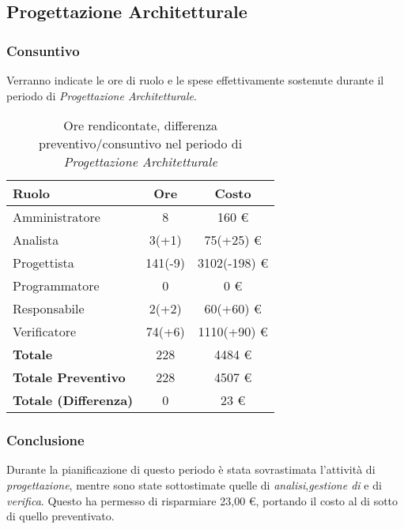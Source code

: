 \subsection{Progettazione Architetturale}
\subsubsection{Consuntivo}
Verranno indicate le ore di ruolo e le spese effettivamente sostenute durante il periodo di \textit{Progettazione Architetturale}.

\begin{table}[H]
	\centering
	\begin{tabular}{ l c c }
		\textbf{Ruolo} & \textbf{Ore} & \textbf{Costo} \\
		\hline
		Amministratore & 8 & 160 \euro{} \\
		Analista & 3(+1) & 75(+25) \euro{} \\
		Progettista & 141(-9) & 3102(-198) \euro{} \\
		Programmatore & 0 & 0 \euro{} \\
		Responsabile & 2(+2) & 60(+60) \euro{} \\
		Verificatore & 74(+6) & 1110(+90) \euro{} \\
		\hline
		\textbf{Totale \glossaryItem{Consuntivo}} & 228 & 4484 \euro{} \\
		\hline
		\textbf{Totale Preventivo} & 228 & 4507 \euro{} \\
		\hline
		\textbf{Totale (Differenza)} & 0 & 23 \euro{} \\
		\hline
	\end{tabular}
	\caption{Ore rendicontate, differenza preventivo/consuntivo nel periodo di \textit{Progettazione Architetturale}}
\end{table}



\subsubsection{Conclusione}
Durante la pianificazione di questo periodo \`e stata sovrastimata l'attivit\`a di \textit{progettazione}, mentre sono state sottostimate quelle di \textit{analisi},\textit{gestione di } e di \textit{verifica}.
Questo ha permesso di risparmiare 23,00 \euro{}, portando il costo  al di sotto di quello preventivato.

